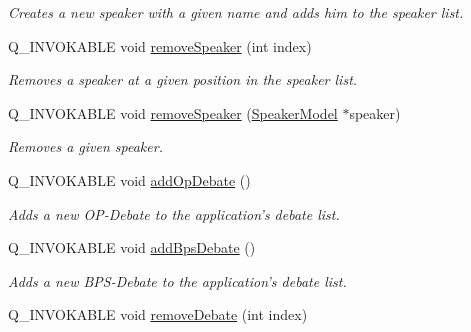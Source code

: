\begin{DoxyCompactItemize}
\begin{DoxyCompactList}\small\item\em Creates a new speaker with a given name and adds him to the speaker list. \end{DoxyCompactList}\item 
\hypertarget{classMainModel_ad40184a652b1747e54fe292596988406}{Q\-\_\-\-I\-N\-V\-O\-K\-A\-B\-L\-E void \hyperlink{classMainModel_ad40184a652b1747e54fe292596988406}{remove\-Speaker} (int index)}\label{classMainModel_ad40184a652b1747e54fe292596988406}

\begin{DoxyCompactList}\small\item\em Removes a speaker at a given position in the speaker list. \end{DoxyCompactList}\item 
\hypertarget{classMainModel_aacae118923c35695011e123fd23fa953}{Q\-\_\-\-I\-N\-V\-O\-K\-A\-B\-L\-E void \hyperlink{classMainModel_aacae118923c35695011e123fd23fa953}{remove\-Speaker} (\hyperlink{classSpeakerModel}{Speaker\-Model} $\ast$speaker)}\label{classMainModel_aacae118923c35695011e123fd23fa953}

\begin{DoxyCompactList}\small\item\em Removes a given speaker. \end{DoxyCompactList}\item 
\hypertarget{classMainModel_a07cfd68a24326492b77f4e894c271ec1}{Q\-\_\-\-I\-N\-V\-O\-K\-A\-B\-L\-E void \hyperlink{classMainModel_a07cfd68a24326492b77f4e894c271ec1}{add\-Op\-Debate} ()}\label{classMainModel_a07cfd68a24326492b77f4e894c271ec1}

\begin{DoxyCompactList}\small\item\em Adds a new O\-P-\/\-Debate to the application's debate list. \end{DoxyCompactList}\item 
\hypertarget{classMainModel_a7ecaa63c19d9a441ec3256dfc3ded2de}{Q\-\_\-\-I\-N\-V\-O\-K\-A\-B\-L\-E void \hyperlink{classMainModel_a7ecaa63c19d9a441ec3256dfc3ded2de}{add\-Bps\-Debate} ()}\label{classMainModel_a7ecaa63c19d9a441ec3256dfc3ded2de}

\begin{DoxyCompactList}\small\item\em Adds a new B\-P\-S-\/\-Debate to the application's debate list. \end{DoxyCompactList}\item 
\hypertarget{classMainModel_ab7aee65aefd3d6bf4f19c4e306ed7efd}{Q\-\_\-\-I\-N\-V\-O\-K\-A\-B\-L\-E void \hyperlink{classMainModel_ab7aee65aefd3d6bf4f19c4e306ed7efd}{remove\-Debate} (int index)}\label{classMainModel_ab7aee65aefd3d6bf4f19c4e306ed7efd}


\end{DoxyCompactItemize}

